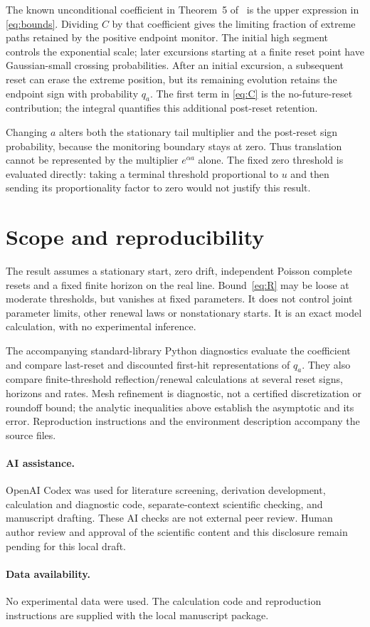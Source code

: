 \documentclass[11pt,a4paper]{article}
\begin{document}
The known unconditional coefficient in Theorem~5 of~\cite{DHM} is the upper
expression in \eqref{eq:bounds}. Dividing $C$ by that coefficient gives the
limiting fraction of extreme paths retained by the positive endpoint monitor.
The initial high segment controls the exponential scale; later excursions
starting at a finite reset point have Gaussian-small crossing probabilities.
After an initial excursion, a subsequent reset can erase the extreme position,
but its remaining evolution retains the endpoint sign with probability $q_a$.
The first term in \eqref{eq:C} is the no-future-reset contribution; the integral
quantifies this additional post-reset retention.

Changing $a$ alters both the stationary tail multiplier and the post-reset sign
probability, because the monitoring boundary stays at zero. Thus translation
cannot be represented by the multiplier $e^{\alpha a}$ alone.
The fixed zero threshold is evaluated directly: taking a terminal threshold
proportional to $u$ and then sending its proportionality factor to zero
would not justify this result.

\section{Scope and reproducibility}
The result assumes a stationary start, zero drift, independent Poisson complete
resets and a fixed finite horizon on the real line. Bound~\eqref{eq:R} may be
loose at moderate thresholds, but vanishes at fixed parameters. It does not
control joint parameter limits, other renewal laws or nonstationary starts.
It is an exact model calculation, with no experimental inference.

The accompanying standard-library Python diagnostics evaluate the coefficient
and compare last-reset and discounted first-hit representations of $q_a$.
They also compare finite-threshold reflection/renewal calculations at several
reset signs, horizons and rates. Mesh refinement is diagnostic, not a certified
discretization or roundoff bound; the analytic inequalities above establish
the asymptotic and its error. Reproduction instructions and the environment
description accompany the source files.

\paragraph{AI assistance.}
OpenAI Codex was used for literature screening, derivation development,
calculation and diagnostic code, separate-context scientific checking, and
manuscript drafting. These AI checks are not external peer review.
Human author review and approval of the scientific content and this disclosure
remain pending for this local draft.

\paragraph{Data availability.}
No experimental data were used. The calculation code and reproduction
instructions are supplied with the local manuscript package.



\end{document}
